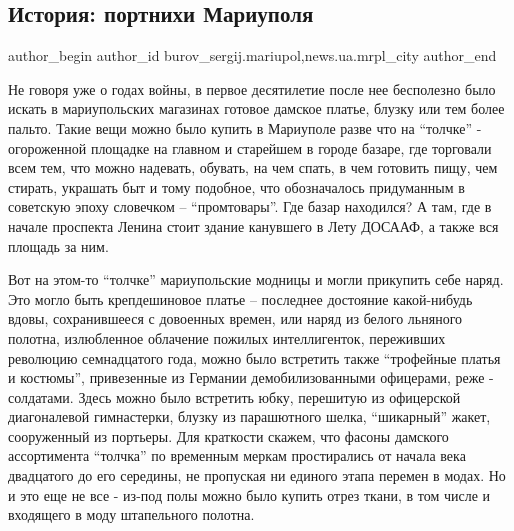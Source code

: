  
 
 
 
 
 
\subsection{История: портнихи Мариуполя}
\label{sec:20_10_2018.stz.news.ua.mrpl_city.1.istoria_portnihi_mariupolja}
 
\ifcmt
 author_begin
   author_id burov_sergij.mariupol,news.ua.mrpl_city
 author_end
\fi


Не говоря уже о годах войны, в первое десятилетие после нее бесполезно было
искать в мариупольских магазинах готовое дамское платье, блузку или тем более
пальто. Такие вещи можно было купить в Мариуполе разве что на \enquote{толчке}
- огороженной площадке на главном и старейшем в городе базаре, где торговали
всем тем, что можно надевать, обувать, на чем спать, в чем готовить пищу, чем
стирать, украшать быт и тому подобное, что обозначалось придуманным в советскую
эпоху словечком – \enquote{промтовары}. Где базар находился? А там, где в
начале проспекта Ленина стоит здание канувшего в Лету ДОСААФ, а также вся
площадь за ним.

Вот на этом-то \enquote{толчке} мариупольские модницы и могли прикупить себе
наряд. Это могло быть крепдешиновое платье – последнее достояние какой-нибудь
вдовы, сохранившееся с довоенных времен, или наряд из белого льняного полотна,
излюбленное облачение пожилых интеллигенток, переживших революцию семнадцатого
года, можно было встретить также \enquote{трофейные платья и костюмы},
привезенные из Германии демобилизованными офицерами, реже - солдатами. Здесь
можно было встретить юбку, перешитую из офицерской диагоналевой гимнастерки,
блузку из парашютного шелка, \enquote{шикарный} жакет, сооруженный из портьеры.
Для краткости скажем, что фасоны дамского ассортимента \enquote{толчка} по
временным меркам простирались от начала века двадцатого до его середины, не
пропуская ни единого этапа перемен в модах. Но и это еще не все - из-под полы
можно было купить отрез ткани, в том числе и входящего в моду штапельного
полотна.

